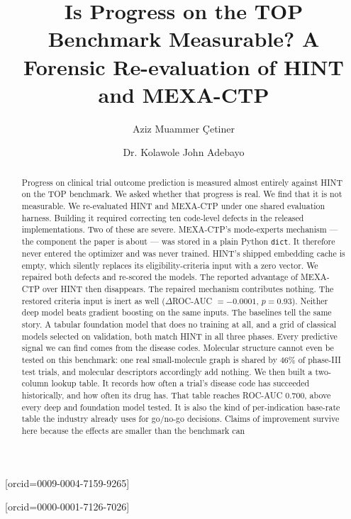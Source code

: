 \documentclass[a4paper,fleqn]{cas-sc}
\begin{document}
\let\WriteBookmarks\relax
\def\floatpagepagefraction{1}
\def\textpagefraction{.001}
\title [mode = title]{Is Progress on the TOP Benchmark Measurable? A Forensic Re-evaluation of HINT and MEXA-CTP}
\author[1]{Aziz Muammer Çetiner}[orcid=0009-0004-7159-9265]
\author[1]{Dr. Kolawole John Adebayo}[orcid=0000-0001-7126-7026]
\cormark[1]
\begin{abstract}
Progress on clinical trial outcome prediction is measured almost entirely against HINT on the TOP
benchmark. We asked whether that progress is real. We find that it is not measurable.
We re-evaluated HINT and MEXA-CTP under one shared evaluation harness. Building it required
correcting ten code-level defects in the released implementations. Two of these are severe.
MEXA-CTP's mode-experts mechanism --- the component the paper is about --- was stored in a plain
Python \texttt{dict}. It therefore never entered the optimizer and was never trained. HINT's
shipped embedding cache is empty, which silently replaces its eligibility-criteria input with a
zero vector. We repaired both defects and re-scored the models. The reported advantage of
MEXA-CTP over HINT then disappears. The repaired mechanism contributes nothing. The restored
criteria input is inert as well ($\Delta$ROC-AUC $=-0.0001$, $p=0.93$). Neither deep model beats
gradient boosting on the same inputs.
The baselines tell the same story. A tabular foundation model that does no training at all, and a
grid of classical models selected on validation, both match HINT in all three phases. Every
predictive signal we can find comes from the disease codes. Molecular structure cannot even be
tested on this benchmark: one real small-molecule graph is shared by $46\%$ of phase-III test
trials, and molecular descriptors accordingly add nothing. We then built a two-column lookup
table. It records how often a trial's disease code has succeeded historically, and how often its
drug has. That table reaches ROC-AUC $0.700$, above every deep and foundation model tested. It is
also the kind of per-indication base-rate table the industry already uses for go/no-go decisions.
Claims of improvement survive here because the effects are smaller than the benchmark can

\end{abstract}
\end{document}
